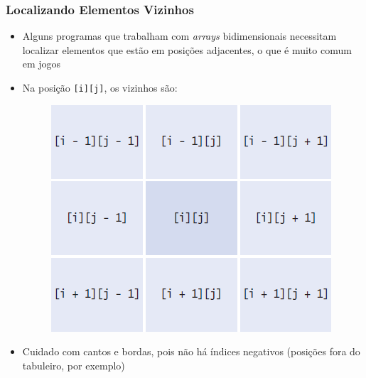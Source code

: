 \documentclass[xcolor={dvipsnames,table},aspectratio=169]{beamer}
\begin{document}
\begin{frame}\frametitle{Localizando Elementos Vizinhos}
\begin{itemize}
	\item Alguns programas que trabalham com \emph{arrays} bidimensionais necessitam localizar elementos que estão em posições adjacentes, o que é muito comum em jogos
	\item Na posição \texttt{[i][j]}, os vizinhos são:
\begin{figure}[h]
	\includegraphics[height=0.4\paperheight,center]{pucrs-ep-fprog-unidade_06-arrays-laminas-array_2d_vizinhos.png}
\end{figure}
	\item Cuidado com cantos e bordas, pois não há índices negativos (posições fora do tabuleiro, por exemplo)
\end{itemize}
\end{frame}
\end{document}
